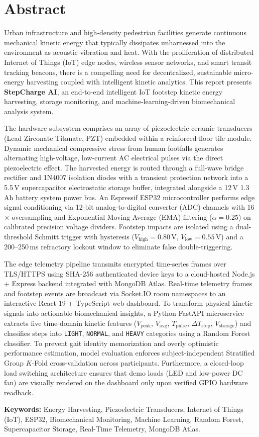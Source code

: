 \chapter*{Abstract}

Urban infrastructure and high-density pedestrian facilities generate continuous mechanical kinetic energy that typically dissipates unharnessed into the environment as acoustic vibration and heat. With the proliferation of distributed Internet of Things (IoT) edge nodes, wireless sensor networks, and smart transit tracking beacons, there is a compelling need for decentralized, sustainable micro-energy harvesting coupled with intelligent kinetic analytics. This report presents \textbf{StepCharge AI}, an end-to-end intelligent IoT footstep kinetic energy harvesting, storage monitoring, and machine-learning-driven biomechanical analysis system.

The hardware subsystem comprises an array of piezoelectric ceramic transducers (Lead Zirconate Titanate, PZT) embedded within a reinforced floor tile module. Dynamic mechanical compressive stress from human footfalls generates alternating high-voltage, low-current AC electrical pulses via the direct piezoelectric effect. The harvested energy is routed through a full-wave bridge rectifier and 1N4007 isolation diodes with a transient protection network into a 5.5\,V supercapacitor electrostatic storage buffer, integrated alongside a 12\,V 1.3\,Ah battery system power bus. An Espressif ESP32 microcontroller performs edge signal conditioning via 12-bit analog-to-digital converter (ADC) channels with 16$\times$ oversampling and Exponential Moving Average (EMA) filtering ($\alpha = 0.25$) on calibrated precision voltage dividers. Footstep impacts are isolated using a dual-threshold Schmitt trigger with hysteresis ($V_{\text{high}} = 0.80\,\text{V}$, $V_{\text{low}} = 0.55\,\text{V}$) and a 200--250\,ms refractory lockout window to eliminate false double-triggering.

The edge telemetry pipeline transmits encrypted time-series frames over TLS/HTTPS using SHA-256 authenticated device keys to a cloud-hosted Node.js + Express backend integrated with MongoDB Atlas. Real-time telemetry frames and footstep events are broadcast via Socket.IO room namespaces to an interactive React 19 + TypeScript web dashboard. To transform physical kinetic signals into actionable biomechanical insights, a Python FastAPI microservice extracts five time-domain kinetic features ($V_{\text{peak}}$, $V_{\text{avg}}$, $T_{\text{pulse}}$, $\Delta T_{\text{step}}$, $V_{\text{storage}}$) and classifies steps into \texttt{LIGHT}, \texttt{NORMAL}, and \texttt{HEAVY} categories using a Random Forest classifier. To prevent gait identity memorization and overly optimistic performance estimation, model evaluation enforces subject-independent Stratified Group $K$-Fold cross-validation across participants. Furthermore, a closed-loop load switching architecture ensures that demo loads (LED and low-power DC fan) are visually rendered on the dashboard only upon verified GPIO hardware readback.

\vspace{0.18in}
\noindent
\textbf{Keywords:} Energy Harvesting, Piezoelectric Transducers, Internet of Things (IoT), ESP32, Biomechanical Monitoring, Machine Learning, Random Forest, Supercapacitor Storage, Real-Time Telemetry, MongoDB Atlas.
\clearpage

